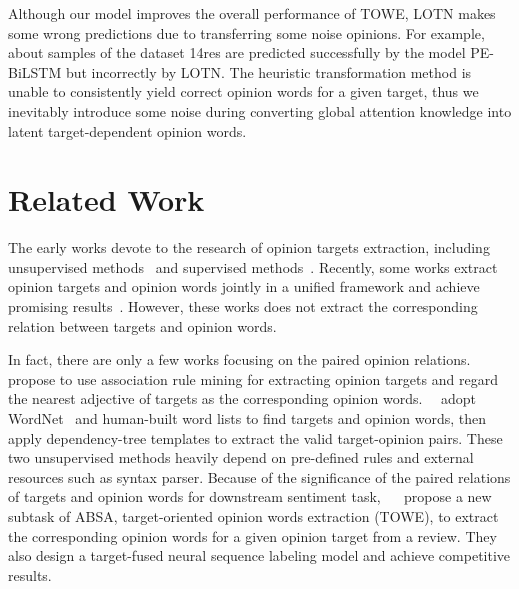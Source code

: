 \documentclass[letterpaper]{article} \usepackage{aaai20}  \usepackage{times}  \usepackage{helvet} \usepackage{courier}  \usepackage[hyphens]{url}  \usepackage{graphicx} \urlstyle{rm} \def\UrlFont{\rm}  \usepackage{graphicx}
\begin{document}
Although our model improves the overall performance of TOWE, LOTN makes some wrong predictions due to transferring some noise opinions. For example, about  samples of the dataset 14res are predicted successfully by the model PE-BiLSTM but incorrectly by LOTN. The heuristic transformation method is unable to consistently yield correct opinion words for a given target, thus we inevitably introduce some noise during converting global attention knowledge into latent target-dependent opinion words.

\section{Related Work}
The early works devote to the research of opinion targets extraction, including unsupervised methods~\cite{DBLP:conf/naacl/PopescuE05,DBLP:conf/ijcnlp/0003W08,DBLP:journals/coling/QiuLBC11,DBLP:conf/emnlp/LiuXZ12} and supervised methods~\cite{jin2009novel,DBLP:conf/coling/LiHHZXZY10,DBLP:conf/emnlp/LiuJM15,DBLP:journals/kbs/PoriaCG16,DBLP:conf/acl/XuLSY18}. Recently, some works extract opinion targets and opinion words jointly in a unified framework and achieve promising results~\cite{DBLP:journals/coling/QiuLBC11,DBLP:conf/emnlp/LiuXZ12,DBLP:conf/ijcai/LiuXLZ13,DBLP:conf/emnlp/WangPDX16,DBLP:conf/aaai/WangPDX17,DBLP:conf/emnlp/LiL17}. However, these works does not extract the corresponding relation between targets and opinion words.

In fact, there are only a few works focusing on the paired opinion relations.~\citeauthor{DBLP:conf/kdd/HuL04}~ propose to use association rule mining for extracting opinion targets and regard the nearest adjective of targets as the corresponding opinion words.~\citeauthor{DBLP:conf/cikm/ZhuangJZ06}~ adopt WordNet~\cite{miller1995wordnet} and human-built word lists to find targets and opinion words, then apply dependency-tree templates to extract the valid target-opinion pairs. These two unsupervised methods heavily depend on pre-defined rules and external resources such as syntax parser. Because of the significance of the paired relations of targets and opinion words for downstream sentiment task, ~\citeauthor{DBLP:conf/naacl/FanWDHC19}~ propose a new subtask of ABSA, target-oriented opinion words extraction (TOWE), to extract the corresponding opinion words for a given opinion target from a review. They also design a target-fused neural sequence labeling model and achieve competitive results.
\end{document}

